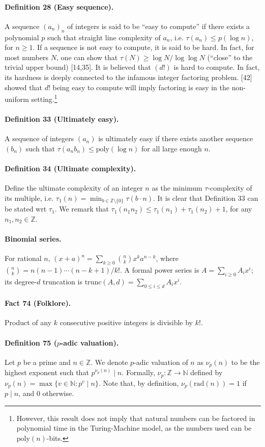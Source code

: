 \documentclass[10pt,a4paper]{article}
\begin{document}
\paragraph{Definition 28 (Easy sequence).} A sequence $(a_n)_n$ of integers is said to be ``easy to compute'' if there exists a polynomial $p$ such that straight line complexity of $a_n$, i.e. $\tau(a_n)\le p(\log n)$, for $n\ge1$. If a sequence is not easy to compute, it is said to be hard. In fact, for most numbers $N$, one can show that $\tau(N)\ge\log N/\log\log N$ (``close'' to the trivial upper bound) [14,35]. It is believed that $(d!)$ is hard to compute. In fact, its hardness is deeply connected to the infamous integer factoring problem. [42] showed that $d!$ being easy to compute will imply factoring is easy in the non-uniform setting.\footnote{However, this result does not imply that natural numbers can be factored in polynomial time in the Turing-Machine model, as the numbers used can be $\mathrm{poly}(n)$-bits.}
\paragraph{Definition 33 (Ultimately easy).} A sequence of integers $(a_n)$ is ultimately easy if there exists another sequence $(b_n)$ such that $\tau(a_nb_n)\le\mathrm{poly}(\log n)$ for all large enough $n$.
\paragraph{Definition 34 (Ultimate complexity).} Define the ultimate complexity of an integer $n$ as the minimum $\tau$-complexity of its multiple, i.e. $\tau_1(n)=\min_{b\in\mathbb Z\setminus\{0\}}\tau(b\cdot n)$. It is clear that Definition 33 can be stated wrt $\tau_1$. We remark that $\tau_1(n_1n_2)\le\tau_1(n_1)+\tau_1(n_2)+1$, for any $n_1,n_2\in\mathbb Z$.
\paragraph{Binomial series.} For rational $n$, $(x+a)^n=\sum_{k\ge0}\binom nkx^ka^{n-k}$, where $\binom nk=n(n-1)\cdots(n-k+1)/k!$. A formal power series is $A=\sum_{i\ge0}A_ix^i$; its degree-$d$ truncation is $\mathrm{trunc}(A,d)=\sum_{0\le i\le d}A_ix^i$.
\paragraph{Fact 74 (Folklore).} Product of any $k$ consecutive positive integers is divisible by $k!$.
\paragraph{Definition 75 ($p$-adic valuation).} Let $p$ be a prime and $n\in\mathbb Z$. We denote $p$-adic valuation of $n$ as $\nu_p(n)$ to be the highest exponent such that $p^{\nu_p(n)}\mid n$. Formally, $\nu_p:\mathbb Z\longrightarrow\mathbb N$ defined by $\nu_p(n)=\max\{v\in\mathbb N:p^v\mid n\}$. Note that, by definition, $\nu_p(\mathrm{rad}(n))=1$ if $p\mid n$, and 0 otherwise.
\end{document}
